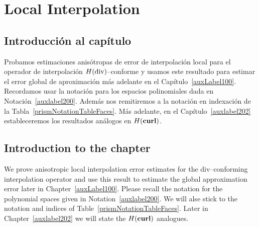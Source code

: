 \chapter{Local Interpolation}\label{auxlabel421}
\section*{Introducci\'on al cap\'itulo}
Probamos estimaciones anis\'otropas de error de interpolaci\'on local
para el operador de interpolaci\'on
$H(\operatorname{\textrm{div}})$--conforme
y usamos este resultado para estimar el error global de aproximaci\'on
m\'as adelante en el Cap\'itulo~\ref{auxLabel100}. 
Recordamos usar la notaci\'on para los espacios polinomiales
dada en Notaci\'on~\ref{auxlabel200}. Adem\'as nos remitiremos a la
notaci\'on en indexaci\'on de la Tabla~\ref{prismNotationTableFaces}.
M\'as adelante, en el Cap\'itulo~\ref{auxlabel202} 
estableceremos los resultados an\'alogos en $H(\textbf{curl})$.
\section*{Introduction to the chapter}
We prove anisotropic local interpolation error estimates
for the div--conforming interpolation
operator
and use this result to estimate the global approximation error later
in Chapter~\ref{auxLabel100}. 
Please recall 
the notation for the polynomial spaces given in Notation~\ref{auxlabel200}. We 
will alse stick to the notation and indices of Table~\ref{prismNotationTableFaces}.
Later in Chapter~\ref{auxlabel202} we will state the $H(\textbf{curl})$ analogues.





